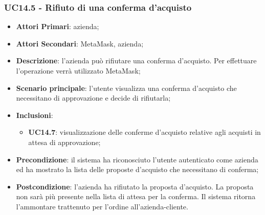 \subsubsection{UC14.5 - Rifiuto di una conferma d'acquisto}
\begin{itemize}
	\item \textbf{Attori Primari}: azienda;
	\item \textbf{Attori Secondari}: MetaMask\glo, azienda;
	\item \textbf{Descrizione}: l'azienda può rifiutare una conferma d'acquisto\glo. Per effettuare l'operazione verrà utilizzato MetaMask\glo;
	\item \textbf{Scenario principale}: l'utente visualizza una conferma d'acquisto che necessitano di approvazione e decide di rifiutarla;
	\item \textbf{Inclusioni}: 
	\begin{itemize}
		\item \textbf{UC14.7}: visualizzazione delle conferme d'acquisto relative agli acquisti in attesa di approvazione;
	\end{itemize}
	\item \textbf{Precondizione}: il sistema ha riconosciuto l'utente autenticato come azienda ed ha mostrato la lista delle proposte d'acquisto che necessitano di conferma;
	\item \textbf{Postcondizione}: l'azienda ha rifiutato la proposta d'acquisto. La proposta non sarà più presente nella lista di attesa per la conferma. Il sistema ritorna l'ammontare trattenuto per l'ordine all'azienda-cliente.
\end{itemize}
